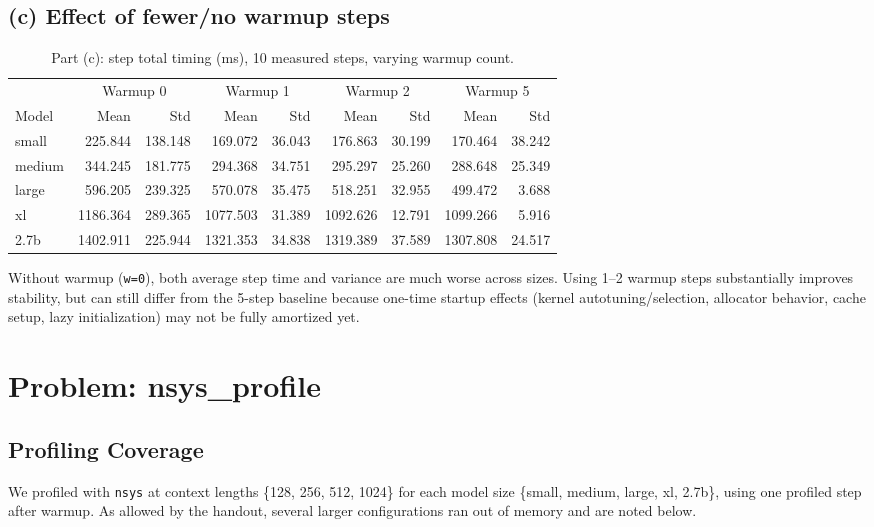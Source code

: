 \documentclass[11pt]{article}
\begin{document}
\subsection*{(c) Effect of fewer/no warmup steps}
\begin{table}[h]
\centering
\begin{tabular}{lrrrrrrrr}
\toprule
 & \multicolumn{2}{c}{Warmup 0} & \multicolumn{2}{c}{Warmup 1} & \multicolumn{2}{c}{Warmup 2} & \multicolumn{2}{c}{Warmup 5} \\
\cmidrule(lr){2-3}\cmidrule(lr){4-5}\cmidrule(lr){6-7}\cmidrule(lr){8-9}
Model & Mean & Std & Mean & Std & Mean & Std & Mean & Std \\
\midrule
small & 225.844 & 138.148 & 169.072 & 36.043 & 176.863 & 30.199 & 170.464 & 38.242 \\
medium & 344.245 & 181.775 & 294.368 & 34.751 & 295.297 & 25.260 & 288.648 & 25.349 \\
large & 596.205 & 239.325 & 570.078 & 35.475 & 518.251 & 32.955 & 499.472 & 3.688 \\
xl & 1186.364 & 289.365 & 1077.503 & 31.389 & 1092.626 & 12.791 & 1099.266 & 5.916 \\
2.7b & 1402.911 & 225.944 & 1321.353 & 34.838 & 1319.389 & 37.589 & 1307.808 & 24.517 \\
\bottomrule
\end{tabular}
\caption{Part (c): step total timing (ms), 10 measured steps, varying warmup count.}
\end{table}

Without warmup (\texttt{w=0}), both average step time and variance are much worse across sizes. Using 1--2 warmup steps substantially improves stability, but can still differ from the 5-step baseline because one-time startup effects (kernel autotuning/selection, allocator behavior, cache setup, lazy initialization) may not be fully amortized yet.

\section{Problem: nsys\_profile}
\subsection*{Profiling Coverage}
We profiled with \texttt{nsys} at context lengths \{128, 256, 512, 1024\} for each model size \{small, medium, large, xl, 2.7b\}, using one profiled step after warmup. As allowed by the handout, several larger configurations ran out of memory and are noted below.
\end{document}
